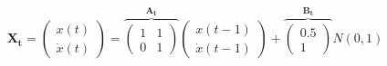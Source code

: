 \documentclass[a4paper,12pt]{report}
\begin{document}
\begin{equation*}
	\mathbf{X_t} = \left(
		\begin{array}{c}
		x(t) \\
		\dot{x}(t)
		\end{array} \right) = 
		\overbrace{
		\left(
			\begin{array}{cc}
			1 & 1 \\
			0 & 1 
			\end{array} \right)}^{\mathbf{A_t} }
			\left( 
			\begin{array}{c} 
				x(t-1) \\
				\dot{x}(t-1)
			\end{array} \right)
			+
			\overbrace{
			\left( 
			\begin{array}{c} 
				0.5 \\
				1
			\end{array} \right)}^{\mathbf{B_t} }
			N(0,1)
\end{equation*}
\end{document}
